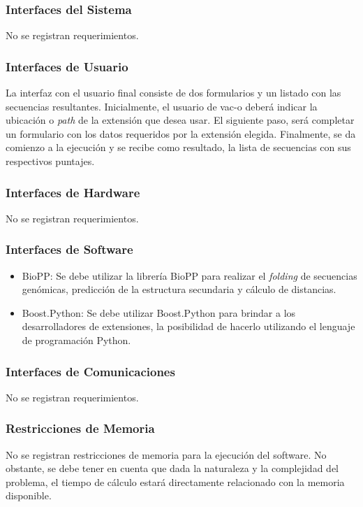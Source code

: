 \documentclass[10pt,a4paper]{article}
\begin{document}
    \subsubsection{Interfaces del Sistema}
    No se registran requerimientos.

    \subsubsection{Interfaces de Usuario}
    La interfaz con el usuario final consiste de dos formularios y un listado
con las secuencias resultantes. Inicialmente, el usuario de vac-o deber\'a
indicar la ubicaci\'on o \textit{path} de la extensi\'on que desea usar. El
siguiente paso, ser\'a completar un formulario con los datos requeridos por la
extensi\'on elegida. Finalmente, se da comienzo a la ejecuci\'on y se recibe
como resultado, la lista de secuencias con sus respectivos puntajes.

    \subsubsection{Interfaces de Hardware}
    No se registran requerimientos.

    \subsubsection{Interfaces de Software}
    \begin{itemize}
      \item BioPP: Se debe utilizar la librer\'ia BioPP para realizar el
\textit{folding} de secuencias gen\'omicas, predicci\'on de la estructura
secundaria y c\'alculo de distancias.
      \item Boost.Python: Se debe utilizar Boost.Python para brindar a los
desarrolladores de extensiones, la posibilidad de hacerlo utilizando el lenguaje
de programaci\'on Python.      
    \end{itemize}

    \subsubsection{Interfaces de Comunicaciones}
    No se registran requerimientos.

    \subsubsection{Restricciones de Memoria}
    No se registran restricciones de memoria para la ejecuci\'on del software.
No obstante, se debe tener en cuenta que dada la naturaleza y la complejidad del
problema, el tiempo de c\'alculo estar\'a directamente relacionado con la
memoria disponible.
\end{document}
